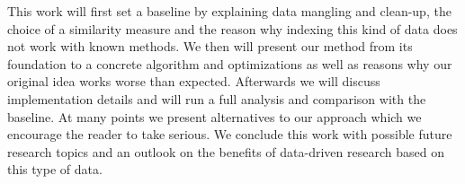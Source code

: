 This work will first set a baseline by explaining data mangling and clean-up, the choice of a similarity measure and the reason why indexing this kind of data does not work with known methods. We then will present our method from its foundation to a concrete algorithm and optimizations as well as reasons why our original idea works worse than expected. Afterwards we will discuss implementation details and will run a full analysis and comparison with the baseline. At many points we present alternatives to our approach which we encourage the reader to take serious. We conclude this work with possible future research topics and an outlook on the benefits of data-driven research based on this type of data.
